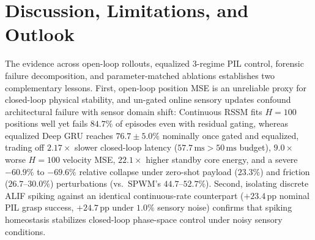 \documentclass[11pt]{article}
\begin{document}
\begin{table}[t]
\centering
\caption{Standby Recurrent Core vs.\ Full End-to-End Closed-Loop Energy Profile (Intel Loihi-2 $1.5\,\text{pJ/SOP}$ excluding passive membrane leak vs.\ Jetson Orin $0.9\,\text{pJ/MAC}$, $7{,}680$ MPPI Rollouts/Step).}
\label{tab:energy}
\end{table}

\section{Discussion, Limitations, and Outlook}

The evidence across open-loop rollouts, equalized 3-regime PIL control, forensic failure decomposition, and parameter-matched ablations establishes two complementary lessons. First, open-loop position MSE is an unreliable proxy for closed-loop physical stability, and un-gated online sensory updates confound architectural failure with sensor domain shift: Continuous RSSM fits $H=100$ positions well yet fails $84.7\%$ of episodes even with residual gating, whereas equalized Deep GRU reaches $76.7 \pm 5.0\%$ nominally once gated and equalized, trading off $2.17\times$ slower closed-loop latency ($57.7\,\text{ms} > 50\,\text{ms}$ budget), $9.0\times$ worse $H=100$ velocity MSE, $22.1\times$ higher standby core energy, and a severe $-60.9\%$ to $-69.6\%$ relative collapse under zero-shot payload ($23.3\%$) and friction ($26.7\text{--}30.0\%$) perturbations (vs.\ SPWM's $44.7\text{--}52.7\%$). Second, isolating discrete ALIF spiking against an identical continuous-rate counterpart ($+23.4\,\text{pp}$ nominal PIL grasp success, $+24.7\,\text{pp}$ under $1.0\%$ sensory noise) confirms that spiking homeostasis stabilizes closed-loop phase-space control under noisy sensory conditions.
\end{document}

